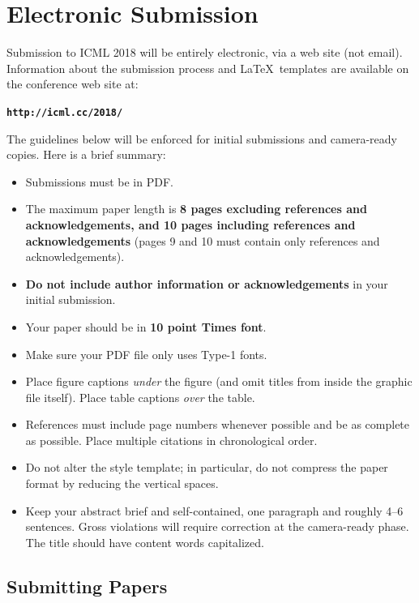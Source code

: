 \documentclass{article}
\begin{document}
\section{Electronic Submission}
\label{submission}

Submission to ICML 2018 will be entirely electronic, via a web site
(not email). Information about the submission process and \LaTeX\ templates
are available on the conference web site at:
\begin{center}
\textbf{\texttt{http://icml.cc/2018/}}
\end{center}

The guidelines below will be enforced for initial submissions and
camera-ready copies. Here is a brief summary:
\begin{itemize}
\item Submissions must be in PDF\@.
\item The maximum paper length is \textbf{8 pages excluding references and
    acknowledgements, and 10 pages including references and acknowledgements}
    (pages 9 and 10 must contain only references and acknowledgements).
\item \textbf{Do not include author information or acknowledgements} in your
    initial submission.
\item Your paper should be in \textbf{10 point Times font}.
\item Make sure your PDF file only uses Type-1 fonts.
\item Place figure captions \emph{under} the figure (and omit titles from inside
    the graphic file itself). Place table captions \emph{over} the table.
\item References must include page numbers whenever possible and be as complete
    as possible. Place multiple citations in chronological order.
\item Do not alter the style template; in particular, do not compress the paper
    format by reducing the vertical spaces.
\item Keep your abstract brief and self-contained, one paragraph and roughly
    4--6 sentences. Gross violations will require correction at the
    camera-ready phase. The title should have content words capitalized.
\end{itemize}

\subsection{Submitting Papers}
\end{document}
